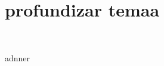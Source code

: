 \section{profundizar temaa} 
\textbf{}\\
\begin{flushleft}


\begin{itemize}




adnner	


\end{itemize} 


\end{flushleft}
